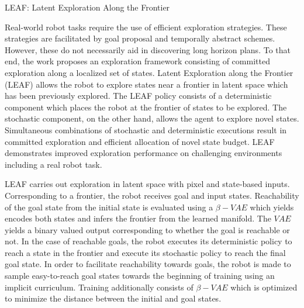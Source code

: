\documentclass[11pt,letterpaper]{article}
\begin{document}
\begin{center}
  \large{LEAF: Latent Exploration Along the Frontier}
\end{center}
Real-world robot tasks require the use of efficient exploration strategies. These strategies are facilitated by goal proposal and temporally abstract schemes. However, these do not necessarily aid in discovering long horizon plans. To that end, the work proposes an exploration framework consisting of committed exploration along a localized set of states. Latent Exploration along the Frontier (LEAF) allows the robot to explore states near a frontier in latent space which has been previously explored. The LEAF policy consists of a deterministic component which places the robot at the frontier of states to be explored. The stochastic component, on the other hand, allows the agent to explore novel states. Simultaneous combinations of stochastic and deterministic executions result in committed exploration and efficient allocation of novel state budget. LEAF demonstrates improved exploration performance on challenging environments including a real robot task. 

LEAF carries out exploration in latent space with pixel and state-based inputs. Corresponding to a frontier, the robot receives goal and input states. Reachability of the goal state from the initial state is evaluated using a $\beta-VAE$ which yields encodes both states and infers the frontier from the learned manifold. The $VAE$ yields a binary valued output corresponding to whether the goal is reachable or not. In the case of reachable goals, the robot executes its deterministic policy to reach a state in the frontier and execute its stochastic policy to reach the final goal state. In order to facilitate reachability towards goals, the robot is made to sample easy-to-reach goal states towards the beginning of training using an implicit curriculum. Training additionally consists of $\beta-VAE$ which is optimized to minimize the distance between the initial and goal states. 
\end{document}

